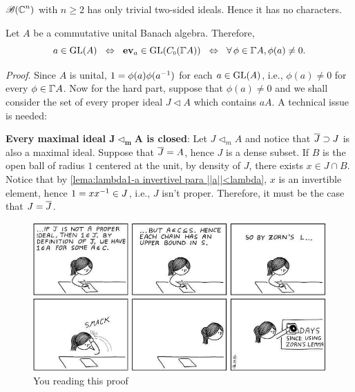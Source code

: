 \begin{exemplo}
$\mathscr B(\operatorname{\mathbb{C}}^n)$ with $n\geqslant 2$ has only trivial two-sided ideals. Hence it has no characters. 
\end{exemplo}

\begin{teorema}
\label{teo: gelfand for BAlg com unit}
Let $A$ be a commutative unital Banach algebra. Therefore, 
\begin{equation*}
    a\in \GL(A) \sse \ev_a \in \GL(\sub C0({{\GGamma}{A}})) \sse \forall\,\phi \in {{\GGamma}{A}}, \phi(a) \neq 0.
\end{equation*}
\end{teorema}
\hspace{-0.5cm}\textit{Proof}. Since $A$ is unital, $1 = \phi(a)\phi({a}^{-1})$ for each $a \in \operatorname{GL}(A)$, i.e., $\phi(a)\neq 0$ for every $\phi \in \GGamma A$. Now for the hard part, suppose that $\phi(a)\neq 0$ and we shall consider the set of every proper ideal $J \triangleleft A$ which contains $aA$. A technical issue is needed:
\begin{itroman}
    \item \label{lema: ideal maximal eh fechado}
    \textbf{Every maximal ideal $\boldsymbol{J \triangleleft_m A}$ is closed}: Let $J \triangleleft_m A$ and notice that $\overline{J} \supset J$ is also a maximal ideal. Suppose that $\overline{J} = A$, hence $J$ is a dense subset. If $B$ is the open ball of radius $1$ centered at the unit, by density of $J$, there exists $x\in J \cap B$. Notice that by \ref{lema:lambda1-a invertivel para ||a||<lambda}, $x$ is an invertible element, hence $1 = x{x}^{-1} \in J$, i.e., $J$ isn't proper. Therefore, it must be the case that $J=\overline{J}$.
\end{itroman}
\begin{figure}[H]
    \centering
    \includegraphics[width=0.75\linewidth]{figures/0DaysSinceUsingZorn.jpg}
    \caption{You reading this proof}
    \label{fig:0DyasSinceUsingZorn}
\end{figure}

